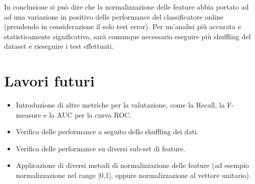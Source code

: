 \documentclass[fleqn,10pt]{SelfArx} %
\begin{document}
In conclusione si può dire che la normalizzazione delle feature abbia portato ad ad una variazione in positivo delle performance del classificatore online (prendendo in considerazione il solo test error).  Per un'analisi più accurata e statisticamente significativa, sarà comunque necessario eseguire più shuffling del dataset e rieseguire i test effettuati.

\section{Lavori futuri}
\begin{itemize}
\item Introduzione di altre metriche per la valutazione, come la Recall, la F-measure e la AUC per la curva ROC.
\item Verifica delle performance a seguito dello shuffling dei dati.
\item Verifica delle performance su diversi sub-set di feature.
\item Applicazione di diversi metodi di normalizzazione delle feature (ad esempio normalizzazione nel range [0,1], oppure normalizzazione al vettore unitario).

\end{itemize}







\end{document}
